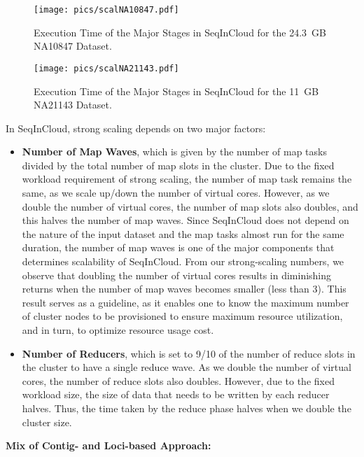 \begin{figure}[!htbp]
  \centering
  \texttt{[image: pics/scalNA10847.pdf]}
  \caption{Execution Time
           of the Major Stages in SeqInCloud for the 24.3~GB NA10847 Dataset.}
  \label{fig:scalNA10847}
\end{figure}

\begin{figure}[!htbp]
  \centering
  \texttt{[image: pics/scalNA21143.pdf]}
  \caption{Execution Time
           of the Major Stages in SeqInCloud for the 11~GB NA21143 Dataset.}
  \label{fig:scalNA21143}
\end{figure}

In SeqInCloud, strong scaling depends on two major factors:
\begin{itemize}
\item

\textbf{Number of Map Waves}, which is given by the number of map tasks divided by the total number of map slots in the cluster. Due to the fixed workload requirement of strong scaling, the number of map task remains the same, as we scale up/down the number of virtual cores. However, as we double the number of virtual cores, the number of map slots also doubles, and this halves the number of map waves. Since SeqInCloud does not depend on the nature of the input dataset and the map tasks almost run for the same duration, the number of map waves is one of the major components that determines scalability of SeqInCloud. From our strong-scaling numbers, we observe that doubling the number of virtual cores results in diminishing returns when the number of map waves becomes smaller (less than 3). This result serves as a guideline, as it enables one to know the maximum number of cluster nodes to be provisioned to ensure maximum resource utilization, and in turn, to optimize resource usage cost. 

\item

\textbf{Number of Reducers}, which is set to 9/10 of the number of reduce slots in the cluster to have a single reduce wave. As we double the number of virtual cores, the number of reduce slots also doubles. However, due to the fixed workload size, the size of data that needs to be written by each reducer halves. Thus, the time taken by the reduce phase halves when we double the cluster size. 
\end{itemize}

\noindent\textbf{Mix of Contig- and Loci-based Approach:}

